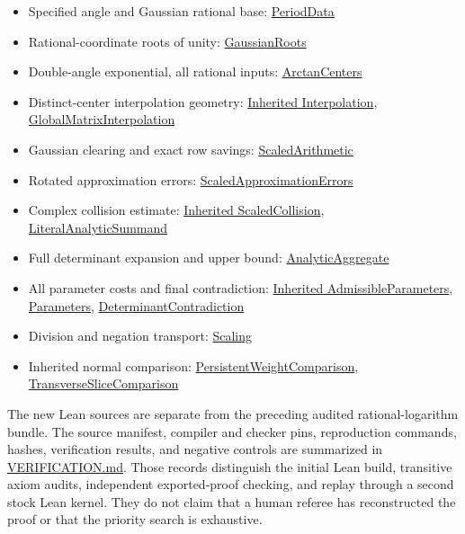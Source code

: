 \documentclass[11pt]{article}
\providecommand{\tightlist}{\setlength{\itemsep}{0pt}\setlength{\parskip}{0pt}}
\begin{document}
\begin{itemize}
\tightlist
\item
  Specified angle and Gaussian rational base:
  \href{lean/Arctangent/PeriodData.lean}{PeriodData}
\item
  Rational-coordinate roots of unity:
  \href{lean/Arctangent/GaussianRoots.lean}{GaussianRoots}
\item
  Double-angle exponential, all rational inputs:
  \href{lean/Arctangent/ArctanCenters.lean}{ArctanCenters}
\item
  Distinct-center interpolation geometry:
  \href{lean/Logarithm/Interpolation.lean}{Inherited Interpolation},
  \href{lean/Arctangent/GlobalMatrixInterpolation.lean}{GlobalMatrixInterpolation}
\item
  Gaussian clearing and exact row savings:
  \href{lean/Arctangent/ScaledArithmetic.lean}{ScaledArithmetic}
\item
  Rotated approximation errors:
  \href{lean/Arctangent/ScaledApproximationErrors.lean}{ScaledApproximationErrors}
\item
  Complex collision estimate:
  \href{lean/Logarithm/ScaledCollision.lean}{Inherited ScaledCollision},
  \href{lean/Arctangent/LiteralAnalyticSummand.lean}{LiteralAnalyticSummand}
\item
  Full determinant expansion and upper bound:
  \href{lean/Arctangent/AnalyticAggregate.lean}{AnalyticAggregate}
\item
  All parameter costs and final contradiction:
  \href{lean/Logarithm/AdmissibleParameters.lean}{Inherited
  AdmissibleParameters},
  \href{lean/Arctangent/Parameters.lean}{Parameters},
  \href{lean/Arctangent/DeterminantContradiction.lean}{DeterminantContradiction}
\item
  Division and negation transport:
  \href{lean/Arctangent/Scaling.lean}{Scaling}
\item
  Inherited normal comparison:
  \href{lean/OAI/NumberTheory/PiExponent/Approximation/PersistentWeightComparison.lean}{PersistentWeightComparison},
  \href{lean/OAI/NumberTheory/PiExponent/Jets/TransverseSliceComparison.lean}{TransverseSliceComparison}
\end{itemize}

The new Lean sources are separate from the preceding audited
rational-logarithm bundle. The source manifest, compiler and checker
pins, reproduction commands, hashes, verification results, and negative
controls are summarized in \href{lean/VERIFICATION.md}{VERIFICATION.md}.
Those records distinguish the initial Lean build, transitive axiom
audits, independent exported-proof checking, and replay through a second
stock Lean kernel. They do not claim that a human referee has
reconstructed the proof or that the priority search is exhaustive.
\end{document}
